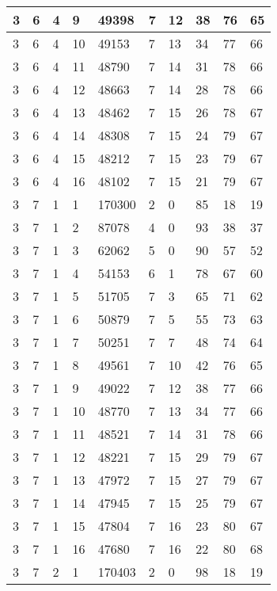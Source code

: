 \begin{table}[!ht]
\begin{tabular}{|l|l|l|l|l|l|l|l|l|l|}
        3 & 6 & 4 & 9 & 49398 & 7 & 12 & 38 & 76 & 65 \\ \hline
        3 & 6 & 4 & 10 & 49153 & 7 & 13 & 34 & 77 & 66 \\ \hline
        3 & 6 & 4 & 11 & 48790 & 7 & 14 & 31 & 78 & 66 \\ \hline
        3 & 6 & 4 & 12 & 48663 & 7 & 14 & 28 & 78 & 66 \\ \hline
        3 & 6 & 4 & 13 & 48462 & 7 & 15 & 26 & 78 & 67 \\ \hline
        3 & 6 & 4 & 14 & 48308 & 7 & 15 & 24 & 79 & 67 \\ \hline
        3 & 6 & 4 & 15 & 48212 & 7 & 15 & 23 & 79 & 67 \\ \hline
        3 & 6 & 4 & 16 & 48102 & 7 & 15 & 21 & 79 & 67 \\ \hline
        3 & 7 & 1 & 1 & 170300 & 2 & 0 & 85 & 18 & 19 \\ \hline
        3 & 7 & 1 & 2 & 87078 & 4 & 0 & 93 & 38 & 37 \\ \hline
        3 & 7 & 1 & 3 & 62062 & 5 & 0 & 90 & 57 & 52 \\ \hline
        3 & 7 & 1 & 4 & 54153 & 6 & 1 & 78 & 67 & 60 \\ \hline
        3 & 7 & 1 & 5 & 51705 & 7 & 3 & 65 & 71 & 62 \\ \hline
        3 & 7 & 1 & 6 & 50879 & 7 & 5 & 55 & 73 & 63 \\ \hline
        3 & 7 & 1 & 7 & 50251 & 7 & 7 & 48 & 74 & 64 \\ \hline
        3 & 7 & 1 & 8 & 49561 & 7 & 10 & 42 & 76 & 65 \\ \hline
        3 & 7 & 1 & 9 & 49022 & 7 & 12 & 38 & 77 & 66 \\ \hline
        3 & 7 & 1 & 10 & 48770 & 7 & 13 & 34 & 77 & 66 \\ \hline
        3 & 7 & 1 & 11 & 48521 & 7 & 14 & 31 & 78 & 66 \\ \hline
        3 & 7 & 1 & 12 & 48221 & 7 & 15 & 29 & 79 & 67 \\ \hline
        3 & 7 & 1 & 13 & 47972 & 7 & 15 & 27 & 79 & 67 \\ \hline
        3 & 7 & 1 & 14 & 47945 & 7 & 15 & 25 & 79 & 67 \\ \hline
        3 & 7 & 1 & 15 & 47804 & 7 & 16 & 23 & 80 & 67 \\ \hline
        3 & 7 & 1 & 16 & 47680 & 7 & 16 & 22 & 80 & 68 \\ \hline
        3 & 7 & 2 & 1 & 170403 & 2 & 0 & 98 & 18 & 19 \\ \hline

\end{tabular}
\end{table}

